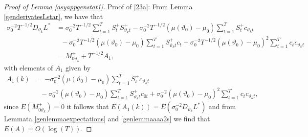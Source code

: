 {{\begin{proof}[Proof of Lemma \ref{asyappgenstat1}] Proof of \eqref{23a}:
From Lemma \ref{genderivatesLstar}, we have that 
\begin{align*}
\sigma_0^{-2} T^{-1/2} D_{\vartheta_k} L^*   &= \sigma_0^{-2} T^{-1/2} \sum_{t = 1}^T S_{t}^+  S_{\vartheta_k t}^+ - \sigma_0^{-2} T^{-1/2} \left(\mu(\vartheta_0)-\mu_0\right) \sum_{t = 1}^T S_{t}^+   c_{\vartheta_k t} \\
     & \ \ \ - \sigma_0^{-2} T^{-1/2} \left(\mu(\vartheta_0)-\mu_0\right)  \sum_{t = 1}^T  S_{\vartheta_k t}^+   c_{t} + \sigma_0^{-2} T^{-1/2} \left(\mu(\vartheta_0)-\mu_0\right)^2  \sum_{t = 1}^T c_{t}  c_{\vartheta_k t} \\
     &=  M_{0\vartheta_k}^{+} + T^{-1/2} A_1,
\end{align*}
with elements of $A_1$ given by
\begin{align*}
    A_{1}(k) &=  - \sigma_0^{-2}  \left(\mu(\vartheta_0)-\mu_0\right) \sum_{t = 1}^T S_{t}^+   c_{\vartheta_k t} \\
    &\ \ \ - \sigma_0^{-2} \left(\mu(\vartheta_0)-\mu_0\right)  \sum_{t = 1}^T  S_{\vartheta_k t}^+   c_{0t} + \sigma_0^{-2}\left(\mu(\vartheta_0)-\mu_0\right)^2  \sum_{t = 1}^T c_{t}  c_{\vartheta_k t}, 
\end{align*}
since $E( M_{0\vartheta_k}^{+}) = 0$ it follows that $E\left(A_{1}(k)\right) =   E\left(\sigma_0^{-2}  D_{\vartheta_k} L^*\right)$ and from Lemmata \ref{genlemmaexpectations} and \ref{genlemmaaaa2s} we find that $E(A) = O(\log(T))$.   




\end{proof}}}
